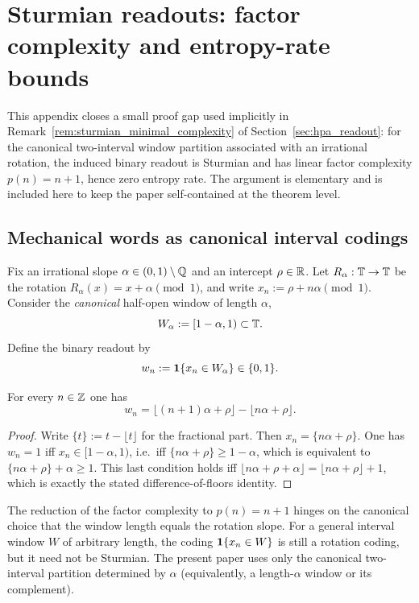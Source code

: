 \section{Sturmian readouts: factor complexity and entropy-rate bounds}
\label{app:sturmian_entropy}
\noindent
This appendix closes a small proof gap used implicitly in
Remark~\ref{rem:sturmian_minimal_complexity} of
Section~\ref{sec:hpa_readout}:
for the canonical two-interval window partition associated with an
irrational rotation, the induced binary readout is Sturmian and has
linear factor complexity $p(n)=n+1$, hence zero entropy rate.
The argument is elementary and is included here to keep the paper
self-contained at the theorem level.

\subsection{Mechanical words as canonical interval codings}
\label{app:sturmian_mechanical}
Fix an irrational slope $\alpha\in(0,1)\setminus\mathbb{Q}$ and an intercept
$\rho\in\mathbb{R}$.
Let $R_\alpha:\mathbb{T}\to\mathbb{T}$ be the rotation $R_\alpha(x)=x+\alpha\pmod{1}$,
and write $x_n:=\rho+n\alpha\pmod{1}$.
Consider the \emph{canonical} half-open window of length $\alpha$,
\begin{equation}
  W_\alpha:=[1-\alpha,1)\subset\mathbb{T}.
\end{equation}
Define the binary readout by
\begin{equation}
  w_n:=\mathbf{1}\{x_n\in W_\alpha\}\in\{0,1\}.
\end{equation}

\begin{proposition}
\label{prop:sturmian_mechanical}
For every $n\in\mathbb{Z}$ one has
\begin{equation}
  w_n=\big\lfloor (n+1)\alpha+\rho\big\rfloor-\big\lfloor n\alpha+\rho\big\rfloor.
\end{equation}
\end{proposition}
\begin{proof}
Write $\{t\}:=t-\lfloor t\rfloor$ for the fractional part.
Then $x_n=\{n\alpha+\rho\}$.
One has $w_n=1$ iff $x_n\in[1-\alpha,1)$, i.e.\ iff
$\{n\alpha+\rho\}\ge 1-\alpha$, which is equivalent to
$\{n\alpha+\rho\}+\alpha\ge 1$.
This last condition holds iff $\lfloor n\alpha+\rho+\alpha\rfloor
=\lfloor n\alpha+\rho\rfloor+1$, which is exactly the stated
difference-of-floors identity.
\end{proof}

\begin{remark}
\label{rem:sturmian_window_length}
The reduction of the factor complexity to $p(n)=n+1$ hinges on the
canonical choice that the window length equals the rotation slope.
For a general interval window $W$ of arbitrary length, the coding
$\mathbf{1}\{x_n\in W\}$ is still a rotation coding, but it need not be
Sturmian. The present paper uses only the canonical two-interval
partition determined by $\alpha$ (equivalently, a length-$\alpha$
window or its complement).
\end{remark}

